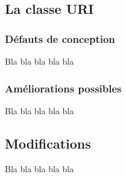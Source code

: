 \documentclass[a4paper]{article}
\begin{document}
	\vspace{0.5cm}

		\subsection{La classe URI}

		\vspace{0.5cm}

			\subsubsection{Défauts de conception}

			Bla bla bla bla bla

			\vspace{0.5cm}

			\subsubsection{Améliorations possibles}

			Bla bla bla bla bla

			\vspace{0.5cm}


		\subsection{Modifications}

		\vspace{0.5cm}

		Bla bla bla bla bla
\end{document}
